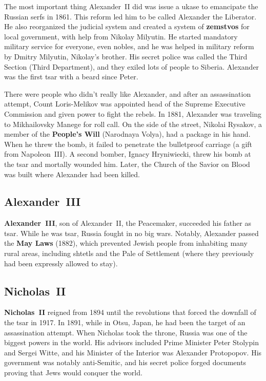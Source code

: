 The most important thing Alexander~II did was issue a ukase to emancipate the Russian serfs in 1861.
This reform led him to be called Alexander the Liberator.
He also reorganized the judicial system and created a system of \textbf{zemstvos} for local government,
with help from Nikolay Milyutin.
He started mandatory military service for everyone, even nobles,
and he was helped in military reform by Dmitry Milyutin, Nikolay's brother.
His secret police was called the Third Section (Third Department), and they exiled lots of people to Siberia.
Alexander was the first tsar with a beard since Peter.

There were people who didn't really like Alexander, and after an assassination attempt,
Count Loris-Melikov was appointed head of the Supreme Executive Commission and given power to fight the rebels.
In 1881, Alexander was traveling to Mikhailovsky Manege for roll call.
On the side of the street, Nikolai Rysakov, a member of the \textbf{People's Will} (Narodnaya Volya),
had a package in his hand.
When he threw the bomb, it failed to penetrate the bulletproof carriage (a gift from Napoleon~III).
A second bomber, Ignacy Hryniwiecki, threw his bomb at the tsar and mortally wounded him.
Later, the Church of the Savior on Blood was built where Alexander had been killed.

\subsection*{Alexander~III}

\textbf{Alexander~III}, son of Alexander~II, the Peacemaker, succeeded his father as tsar.
While he was tsar, Russia fought in no big wars.
Notably, Alexander passed the \textbf{May Laws} (1882), which prevented Jewish people from inhabiting many rural areas,
including shtetls and the Pale of Settlement (where they previously had been expressly allowed to stay).

\subsection*{Nicholas~II}

\textbf{Nicholas~II} reigned from 1894 until the revolutions that forced the downfall of the tsar in 1917.
In 1891, while in Otsu, Japan, he had been the target of an assassination attempt.
When Nicholas took the throne, Russia was one of the biggest powers in the world.
His advisors included Prime Minister Peter Stolypin and Sergei Witte,
and his Minister of the Interior was Alexander Protopopov.
His government was notably anti-Semitic,
and his secret police forged documents proving that Jews would conquer the world.

